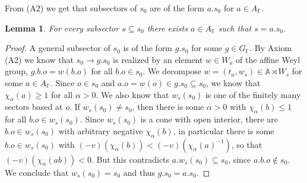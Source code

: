 \documentclass[12pt]{amsart}
\newcommand{\F}{\mathbb{F} }
\newcommand{\A}{\mathbb{A}}
\numberwithin{equation}{section}
\newtheorem{lemma}[theorem]{Lemma}
\theoremstyle{remark} %
\begin{document}
		From (A2) we get that subsectors of $s_0$ are of the form $a.s_0$ for $a\in A_\F$.
		\begin{lemma}\label{lem:subsector_nice}
			For every subsector $s \subseteq s_0$ there exists $a\in A_\F$ such that $s=a.s_0$.
		\end{lemma}
		\begin{proof}
			A general subsector of $s_0$ is of the form $g.s_0$ for some $g\in G_\F$. By Axiom (A2) we know that $s_0 \to g.s_0$ is realized by an element $w\in W_a$ of the affine Weyl group, $g.b.o = w(b.o)$ for all $b.o \in s_0$. We decompose $w = ( t_a,w_s) \in \A \rtimes W_s$ for some $a\in A_\F$. Since $o\in s_0$ and $a.o = w(o) \in g.s_0 \subseteq s_0$, we know that $\chi_\alpha(a) \geq 1$ for all $\alpha >0$. We also know that $w_s(s_0)$ is one of the finitely many sectors based at $o$. If $w_s(s_0) \neq s_0$, then there is some $\alpha >0$ with $\chi_\alpha(b) \leq 1$ for all $b.o \in w_s(s_0)$. Since $w_s(s_0)$ is a cone with open interior, there are $b.o\in w_s(s_0)$ with arbitrary negative $\chi_\alpha(b)$, in particular there is some $b.o\in w_s(s_0)$ with $(-v)(\chi_\alpha(b)) < (-v)(\chi_\alpha(a)^{-1})$, so that $(-v)(\chi_\alpha(ab)) < 0$. But this contradicts $a.w_s(s_0) \subseteq s_0$, since $a.b.o \notin s_0$. We conclude that $w_s(s_0) = s_0$ and thus $g.s_0 = a.s_0$.
		\end{proof}
		
\end{document}
